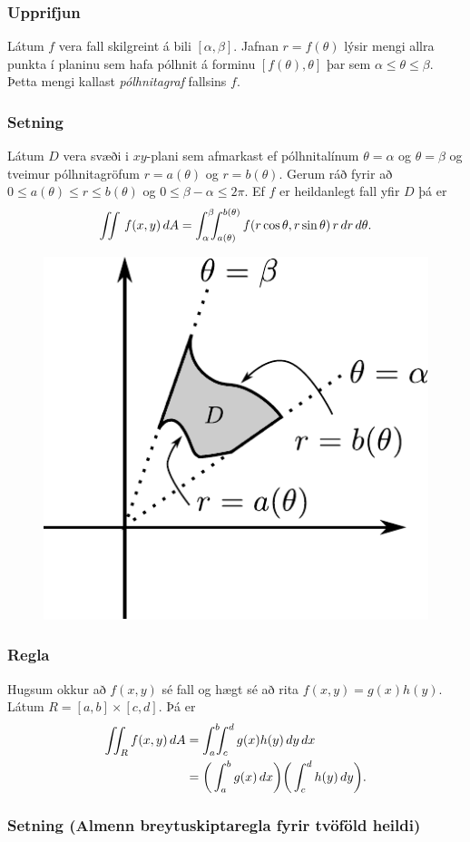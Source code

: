 \subsubsection{Upprifjun }
Látum $f$ vera fall skilgreint á bili 
$[\alpha,\beta]$.  Jafnan $r=f(\theta)$ lýsir mengi allra punkta í
planinu sem hafa pólhnit á forminu $[f(\theta),\theta]$ þar sem
$\alpha\leq\theta\leq\beta$.  Þetta mengi kallast {\em pólhnitagraf}
fallsins $f$. 


\subsubsection{Setning }
Látum $D$ vera svæði i $xy$-plani sem
afmarkast ef pólhnitalínum $\theta=\alpha$ og $\theta=\beta$ og
tveimur pólhnitagröfum $r=a(\theta)$ og $r=b(\theta)$.  Gerum ráð
fyrir að $0\leq a(\theta)\leq
r\leq b(\theta)$ og $0\leq \beta-\alpha\leq 2\pi$.
Ef $f$ er heildanlegt fall yfir $D$
þá er 
$$ \int\!\!\!\int\,f(x,y)\,dA=\int_\alpha^\beta\!\!\!\int_{a(\theta)}^{b(\theta)}
f(r\cos\theta,r\sin\theta)\,r\,dr\, d\theta.$$


\begin {figure}[h!]
 \centering
            \includegraphics[width=0.35\linewidth]{polarsvaedi}
	\caption*{}
\end {figure}



\subsubsection{Regla }
Hugsum okkur að $f(x,y)$ sé fall og hægt sé að rita
$f(x,y)=g(x)h(y)$.  Látum $R=[a,b]\times [c,d]$.  Þá er 
\begin{align*}
\int\!\!\!\int_R f(x,y)\,dA&=\int_a^b\!\!\!\int_{c}^{d}g(x)h(y)\,dy\, dx\\
&=\bigg(\int_a^b g(x)\,dx\bigg)\bigg(\int_c^d h(y)\,dy\bigg).
\end{align*}

 

\subsubsection{Setning (Almenn breytuskiptaregla fyrir tvöföld heildi)}


